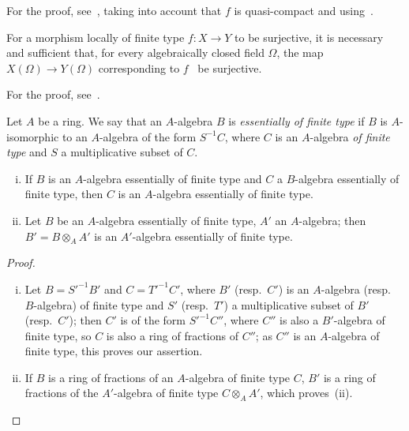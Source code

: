 For the proof, see~, taking into account that $f$ is quasi-compact and using~.

\begin{proposition}[1.3.7]
\label{IV.1.3.7}
For a morphism locally of finite type $f:X\to Y$ to be
surjective, it is necessary and sufficient that, for every algebraically closed field $\Omega$, the map $X(\Omega)\to Y(\Omega)$
corresponding to $f$~ be surjective.
\end{proposition}

For the proof, see~.

\begin{env}[1.3.8]
\label{IV.1.3.8}
Let $A$ be a ring. We say that an $A$-algebra $B$ is \emph{essentially of finite type}
if $B$ is $A$-isomorphic to an $A$-algebra of the form $S^{-1}C$, where $C$ is an $A$-algebra \emph{of
finite type} and $S$ a multiplicative subset of $C$.
\end{env}

\begin{proposition}[1.3.9]
\label{IV.1.3.9}
\medskip\noindent
\begin{enumerate}[(i)]
  \item If $B$ is an $A$-algebra essentially of finite type and $C$
    a $B$-algebra essentially of finite type, then $C$ is an $A$-algebra essentially of finite type.
  \item Let $B$ be an $A$-algebra essentially of finite type, $A'$ an $A$-algebra; then $B'=B\otimes_A A'$
    is an $A'$-algebra essentially of finite type.
\end{enumerate}
\end{proposition}

\begin{proof}
\begin{enumerate}[(i)]
  \item Let $B=S'^{-1}B'$ and $C=T'^{-1}C'$, where $B'$ (resp.\ $C'$) is an $A$-algebra (resp.\
    $B$-algebra) of finite type and $S'$ (resp.\ $T'$) a multiplicative subset of $B'$ (resp.\ $C'$);
    then $C'$ is of the form $S'^{-1}C''$, where $C''$ is also a $B'$-algebra of finite type, so $C$ is also
    a ring of fractions of $C''$; as $C''$ is an $A$-algebra of finite type, this proves
    our assertion.
  \item If $B$ is a ring of fractions of an $A$-algebra of finite type $C$, $B'$ is a ring
    of fractions of the $A'$-algebra of finite type $C\otimes_A A'$, which proves~(ii).
\end{enumerate}
\end{proof}

